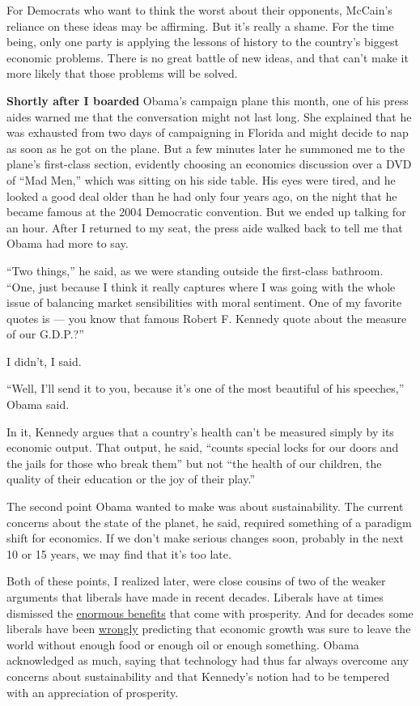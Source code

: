 For Democrats who want to think the worst about their opponents,
McCain's reliance on these ideas may be affirming. But it's really a
shame. For the time being, only one party is applying the lessons of
history to the country's biggest economic problems. There is no great
battle of new ideas, and that can't make it more likely that those
problems will be solved.

\textbf{Shortly after I boarded} Obama's campaign plane this month, one
of his press aides warned me that the conversation might not last long.
She explained that he was exhausted from two days of campaigning in
Florida and might decide to nap as soon as he got on the plane. But a
few minutes later he summoned me to the plane's first-class section,
evidently choosing an economics discussion over a DVD of ``Mad Men,''
which was sitting on his side table. His eyes were tired, and he looked
a good deal older than he had only four years ago, on the night that he
became famous at the 2004 Democratic convention. But we ended up talking
for an hour. After I returned to my seat, the press aide walked back to
tell me that Obama had more to say.

``Two things,'' he said, as we were standing outside the first-class
bathroom. ``One, just because I think it really captures where I was
going with the whole issue of balancing market sensibilities with moral
sentiment. One of my favorite quotes is --- you know that famous Robert
F. Kennedy quote about the measure of our G.D.P.?''

I didn't, I said.

``Well, I'll send it to you, because it's one of the most beautiful of
his speeches,'' Obama said.

In it, Kennedy argues that a country's health can't be measured simply
by its economic output. That output, he said, ``counts special locks for
our doors and the jails for those who break them'' but not ``the health
of our children, the quality of their education or the joy of their
play.''

The second point Obama wanted to make was about sustainability. The
current concerns about the state of the planet, he said, required
something of a paradigm shift for economics. If we don't make serious
changes soon, probably in the next 10 or 15 years, we may find that it's
too late.

Both of these points, I realized later, were close cousins of two of the
weaker arguments that liberals have made in recent decades. Liberals
have at times dismissed the
\href{http://www.nytimes3xbfgragh.onion/2008/04/16/business/16leonhardt.html}{enormous
benefits} that come with prosperity. And for decades some liberals have
been
\href{http://www.nytimes3xbfgragh.onion/1990/12/02/magazine/120290-tierney-magazine.html}{wrongly}
predicting that economic growth was sure to leave the world without
enough food or enough oil or enough something. Obama acknowledged as
much, saying that technology had thus far always overcome any concerns
about sustainability and that Kennedy's notion had to be tempered with
an appreciation of prosperity.

